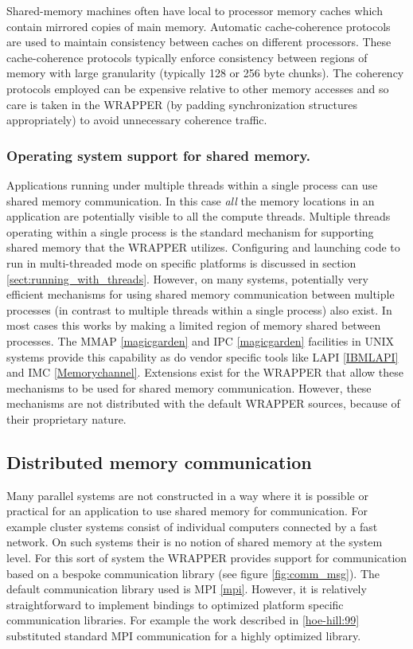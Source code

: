 Shared-memory machines often have local to processor memory caches
which contain mirrored copies of main memory. Automatic cache-coherence
protocols are used to maintain consistency between caches on different
processors. These cache-coherence protocols typically enforce consistency
between regions of memory with large granularity (typically 128 or 256 byte
chunks). The coherency protocols employed can be expensive relative to other
memory accesses and so care is taken in the WRAPPER (by padding synchronization
structures appropriately) to avoid unnecessary coherence traffic.

\subsubsection{Operating system support for shared memory.}

Applications running under multiple threads within a single process can
use shared memory communication. In this case {\it all} the memory locations 
in an application are potentially visible to all the compute threads. Multiple 
threads operating within a single process is the standard mechanism for 
supporting shared memory that the WRAPPER utilizes. Configuring and launching 
code to run in multi-threaded mode on specific platforms is discussed in 
section \ref{sect:running_with_threads}.  However, on many systems, potentially 
very efficient mechanisms for using shared memory communication between 
multiple processes (in contrast to multiple threads within a single 
process) also exist. In most cases this works by making a limited region of 
memory shared between processes. The MMAP \ref{magicgarden} and 
IPC \ref{magicgarden} facilities in UNIX systems provide this capability as do 
vendor specific tools like LAPI \ref{IBMLAPI} and IMC \ref{Memorychannel}. 
Extensions exist for the WRAPPER that allow these mechanisms 
to be used for shared memory communication. However, these mechanisms are not 
distributed with the default WRAPPER sources, because of their proprietary 
nature.

\subsection{Distributed memory communication}
\label{sect:distributed_memory_communication}
Many parallel systems are not constructed in a way where it is
possible or practical for an application to use shared memory
for communication. For example cluster systems consist of individual computers
connected by a fast network. On such systems their is no notion of shared memory
at the system level. For this sort of system the WRAPPER provides support
for communication based on a bespoke communication library 
(see figure \ref{fig:comm_msg}).  The default communication library used is MPI 
\ref{mpi}. However, it is relatively straightforward to implement bindings to 
optimized platform specific communication libraries. For example the work 
described in \ref{hoe-hill:99} substituted standard MPI communication for a 
highly optimized library.

